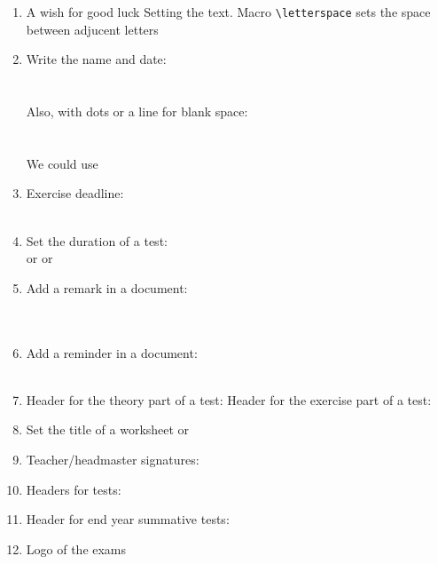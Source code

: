 \documentclass[12pt,a4page]{article}
\begin{document}
\begin{enumerate}
\item A wish for good luck
  \wish
  Setting the text. Macro \verb/\letterspace/ sets the space between adjucent letters
  \makeatletter
  \def\schl@wish{\letterspace{10} ΚΑΛΗ ΤΥΧΗ}
  \makeatother
  \wish
\item Write the name and date:\\
  \fullname\\
  \datefield \\[1ex]
  Also, with dots or a line for blank space:\\
  \\ \datefield{\blankspace{10em}}\\[1ex]
  We could use \\
  \datefield{\getdate}
\item Exercise deadline:\\
  \\
\item Set the duration of a test:\\  or  or 
\item Add a remark in a document:\\
  \\
  \\
\item Add a reminder in a document:\\
  \\
\item Header for the theory part of a test: \theorypart
  Header for the exercise part of a test: \exercisepart
\item Set the title of a worksheet
  \worksheethd{}
  or
\item Teacher/headmaster signatures:\\
  \hfill
\item Headers for tests:
  \examhd{}
\item Header for end year summative tests:
\item Logo of the  exams


\end{enumerate}
\end{document}
